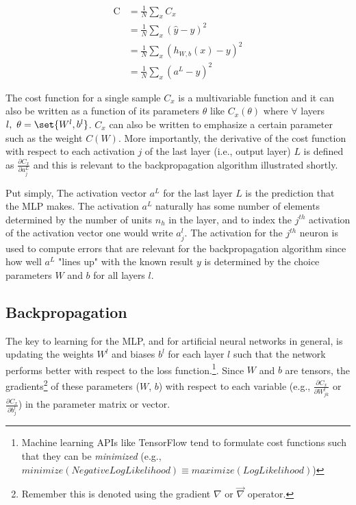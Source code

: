 \documentclass{article}
\DeclarePairedDelimiter\set\{\}
\begin{document}
\begin{equation}
	\begin{aligned}
		\text{C} & = \frac{1}{N} \sum_{x} {C_x}                   \\
		         & = \frac{1}{N} \sum_{x} {(\hat{y} - y)^{2} }    \\
		         & = \frac{1}{N} \sum_{x} {(h_{W,b}(x) - y)^{2} } \\
		         & = \frac{1}{N} \sum_{x} {(a^{L} - y)^{2} }
	\end{aligned}
\end{equation}

The cost function for a single sample $C_x$ is a multivariable function
and it can also be written as a function of its parameters $\theta$ like
$C_x(\theta)$ where $\forall$ layers $l,\ \theta = \set{W^{l}, b^{l}}$. $C_x$ can
also be written to emphasize a certain parameter such as the weight $C(W)$. More importantly,
the derivative of the cost function with respect to each activation $j$ of
the last layer (i.e., output layer) $L$ is defined as
$\frac{\partial C_x}{\partial a_j^{L}}$ and this is
relevant to the backpropagation algorithm illustrated shortly.

Put simply, The activation vector $a^{L}$ for the last layer $L$ is the prediction
that the MLP makes. The activation $a^{L}$ naturally has some number of elements
determined by the number of units $n_h$ in the layer, and to index the $j^{th}$
activation of the activation vector one would write $a_j^{l}$. The activation for
the $j^{th}$ neuron is used to compute errors that are relevant for the
backpropagation algorithm since how well $a^{L}$ "lines up" with the known
result $y$ is determined by the choice parameters $W$ and $b$ for all layers $l$.

\subsection{Backpropagation}

The key to learning for the MLP, and for artificial neural networks in general,
is updating the weights $W^{l}$ and biases $b^{l}$ for each layer $l$ such
that the network performs better with respect to the loss function.\footnote{
Machine learning APIs like TensorFlow tend to formulate cost functions
such that they can be \textit{minimized} (e.g.,
$minimize(NegativeLogLikelihood) \equiv maximize(LogLikelihood)$)}.
Since $W$ and $b$ are tensors, the gradients\footnote{Remember this is denoted
	using the gradient $\nabla$ or $\vec{\nabla}$ operator.}
of these parameters ($W$, $b$) with respect to each variable (e.g.,
$\frac{\partial C_x}{\partial W_{jk}^{l}}$ or
$\frac{\partial C_x}{\partial b_{j}^{l}}$) in the parameter matrix or vector.
\end{document}
